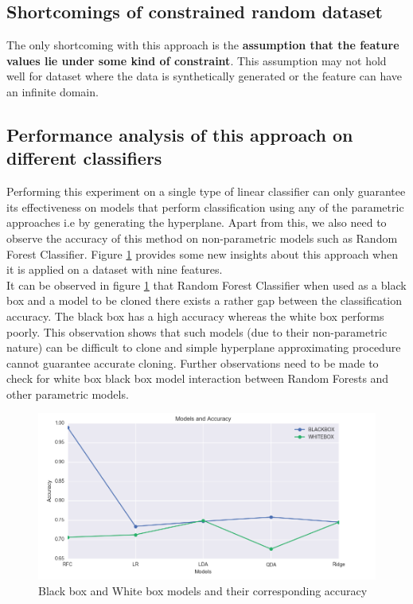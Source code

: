 \documentclass[9pt,twocolumn,twoside]{pnas-new}
\begin{document}
\subsection*{Shortcomings of constrained random dataset}
The only shortcoming with this approach is the \textbf{assumption that the feature values lie under some kind of constraint}. This assumption may not hold well for dataset where the data is synthetically generated or the feature can have an infinite domain.
\\

\subsection*{Performance analysis of this approach on different classifiers}
Performing this experiment on a single type of linear classifier can only guarantee its effectiveness on models that perform classification using any of the parametric approaches i.e by generating the hyperplane. Apart from this, we also need to observe the accuracy of this method on non-parametric models such as Random Forest Classifier. Figure \ref{fig:modelflow} provides some new insights about this approach when it is applied on a dataset with nine features.\\
It can be observed in figure \ref{fig:modelflow} that Random Forest Classifier when used as a black box and a model to be cloned there exists a rather gap between the classification accuracy. The black box has a high accuracy whereas the white box performs poorly. This observation shows that such models (due to their non-parametric nature) can be difficult to clone and simple hyperplane approximating procedure cannot guarantee accurate cloning. Further observations need to be made to check for white box black box model interaction between Random Forests and other parametric models.

\begin{figure}[b!]
    \includegraphics[width=\linewidth]{ModelFlow.png}\hfill
    \caption{Black box and White box models and their corresponding accuracy}
    \label{fig:modelflow}
\end{figure}
\end{document}
